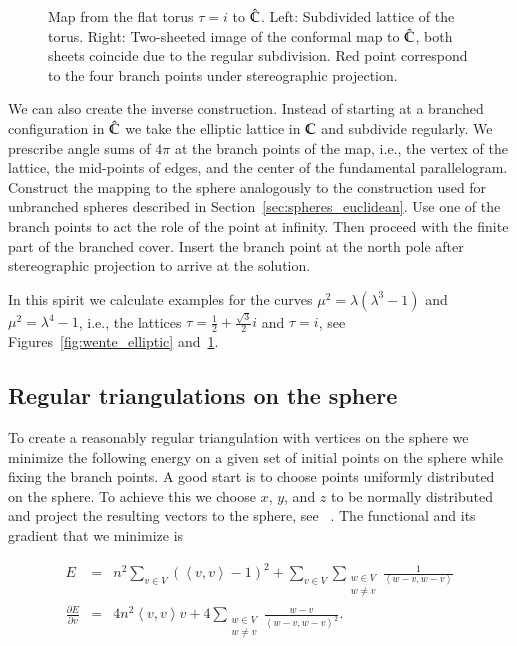 \documentclass[Thesis]{subfiles}
\begin{document}
\begin{figure}
\centering
{}
\caption{
Map from the flat torus $\tau=i$ to $\hat{\mathbb C}$. 
Left: Subdivided lattice of the torus. 
Right: Two-sheeted image of the conformal map to $\hat{\mathbb C}$, both sheets coincide due to the regular subdivision. 
Red point correspond to the four branch points under stereographic projection.
}
\label{fig:square_elliptic} 
\end{figure}

We can also create the inverse construction. 
Instead of starting at a branched configuration in $\hat {\mathbb C}$ we take the elliptic lattice in $\mathbb C$ and subdivide regularly.
We prescribe angle sums of $4\pi$ at the branch points of the map, i.e., the vertex of the lattice, the mid-points of edges, and the center of the fundamental parallelogram.
Construct the mapping to the sphere analogously to the construction used for unbranched spheres described in Section~\ref{sec:spheres_euclidean}.
Use one of the branch points to act the role of the point at infinity.
Then proceed with the finite part of the branched cover.
Insert the branch point at the north pole after stereographic projection to arrive at the solution.

In this spirit we calculate examples for the curves $\mu^2=\lambda(\lambda^3-1)$ and $\mu^2=\lambda^4-1$, i.e., the lattices $\tau=\frac{1}{2}+\frac{\sqrt 3}{2}i$ and $\tau=i$, see Figures~\ref{fig:wente_elliptic} and~\ref{fig:square_elliptic}.

\subsection{Regular triangulations on the sphere}
\label{sec:spherical_triangulations}

To create a reasonably regular triangulation with vertices on the sphere we minimize the following energy on a given set of initial points on the sphere while fixing the branch points. 
A good start is to choose points uniformly distributed on the sphere. 
To achieve this we choose $x$, $y$, and $z$ to be normally distributed and project the resulting vectors to the sphere, see~ \cite{Muller1959}. 
The functional and its gradient that we minimize is

\begin{eqnarray*}
	E &=& n^2\sum_{v\in V}\left( \left<v,v\right> - 1\right)^2 + \sum_{v\in
V}\sum_{\substack{w\in V\\w\neq v}} \frac{1}{\left<w-v, w-v\right>}\\ \frac{\partial
E}{\partial v} &=& 4n^2\left<v,v\right>v + 4\sum_{\substack{w\in V\\w\neq
v}}\frac{w-v}{\left<w-v,w-v\right>^2}.  \end{eqnarray*}
\end{document}
